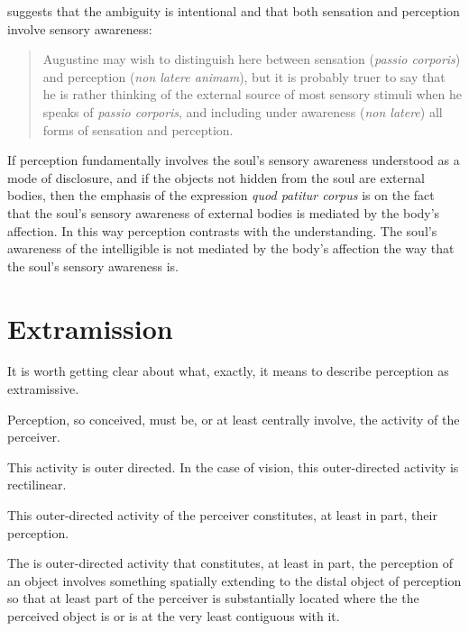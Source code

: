 \documentclass[12pt]{article}
\begin{document}
\citet[]{ODaly:1987fq} suggests that the ambiguity is intentional and that both sensation and perception involve sensory awareness:
\begin{quote}
	Augustine may wish to distinguish here between sensation (\emph{passio corporis}) and perception (\emph{non latere animam}), but it is probably truer to say that he is rather thinking of the external source of most sensory stimuli when he speaks of \emph{passio corporis}, and including under awareness (\emph{non latere}) all forms of sensation and perception.
\end{quote}

If perception fundamentally involves the soul's sensory awareness understood as a mode of disclosure, and if the objects not hidden from the soul are external bodies, then the emphasis of the expression \emph{quod patitur corpus} is on the fact that the soul's sensory awareness of external bodies is mediated by the body's affection. In this way perception contrasts with the understanding. The soul's awareness of the intelligible is not mediated by the body's affection the way that the soul's sensory awareness is.


\section{Extramission} %
\label{sec:extramission}

It is worth getting clear about what, exactly, it means to describe perception as extramissive.

Perception, so conceived, must be, or at least centrally involve, the activity of the perceiver.

This activity is outer directed. In the case of vision, this outer-directed activity is rectilinear.

This outer-directed activity of the perceiver constitutes, at least in part, their perception.

The is outer-directed activity that constitutes, at least in part, the perception of an object involves something spatially extending to the distal object of perception so that at least part of the perceiver is substantially located where the the perceived object is or is at the very least contiguous with it.






\nocite{Tourscher:1933rw}



\end{document}
